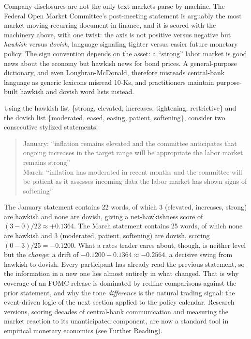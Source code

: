 \documentclass[../ai_in_finance]{subfiles}
\begin{document}

Company disclosures are not the only text markets parse by machine. The Federal Open Market Committee's post-meeting statement is arguably the most market-moving recurring document in finance, and it is scored with the machinery above, with one twist: the axis is not positive versus negative but \emph{hawkish} versus \emph{dovish}, language signaling tighter versus easier future monetary policy. The sign convention depends on the asset: a ``strong'' labor market is good news about the economy but hawkish news for bond prices. A general-purpose dictionary, and even Loughran-McDonald, therefore misreads central-bank language as generic lexicons misread 10-Ks, and practitioners maintain purpose-built hawkish and dovish word lists instead.

Using the hawkish list \{strong, elevated, increases, tightening, restrictive\} and the dovish list \{moderated, eased, easing, patient, softening\}, consider two consecutive stylized statements:

\begin{quote}
\small
January: ``inflation remains elevated and the committee anticipates that ongoing increases in the target range will be appropriate the labor market remains strong''\\
March: ``inflation has moderated in recent months and the committee will be patient as it assesses incoming data the labor market has shown signs of softening''
\end{quote}

The January statement contains 22 words, of which 3 (elevated, increases, strong) are hawkish and none are dovish, giving a net-hawkishness score of $(3-0)/22 \approx +0.1364$. The March statement contains 25 words, of which none are hawkish and 3 (moderated, patient, softening) are dovish, scoring $(0-3)/25 = -0.1200$. What a rates trader cares about, though, is neither level but the \emph{change}: a drift of $-0.1200 - 0.1364 \approx -0.2564$, a decisive swing from hawkish to dovish. Every participant has already read the previous statement, so the information in a new one lies almost entirely in what changed. That is why coverage of an FOMC release is dominated by redline comparisons against the prior statement, and why the tone \emph{difference} is the natural trading signal: the event-driven logic of the next section applied to the policy calendar. Research versions, scoring decades of central-bank communication and measuring the market reaction to its unanticipated component, are now a standard tool in empirical monetary economics (see Further Reading).
\end{document}
